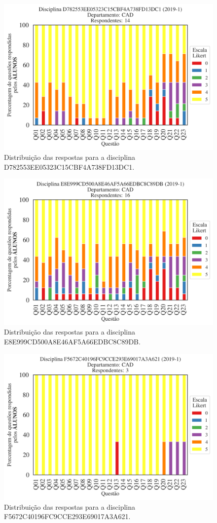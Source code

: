 \documentclass[a4paper,10pt]{article}
\begin{document}
\begin{figure}[h]
\centering
\includegraphics[width=0.485\linewidth]{analise_disciplina_departamento_CAD_ALUNO_TURMA_D782553EE05323C15CBF4A738FD13DC1.png}
\caption{\label{fig:analise_geral_departamento}                Distribuição das respostas para a disciplina D782553EE05323C15CBF4A738FD13DC1.}
\end{figure}
\begin{figure}[h]
\centering
\includegraphics[width=0.485\linewidth]{analise_disciplina_departamento_CAD_ALUNO_TURMA_E8E999CD500A8E46AF5A66EDBC8C89DB.png}
\caption{\label{fig:analise_geral_departamento}                Distribuição das respostas para a disciplina E8E999CD500A8E46AF5A66EDBC8C89DB.}
\end{figure}
\begin{figure}[h]
\centering
\includegraphics[width=0.485\linewidth]{analise_disciplina_departamento_CAD_ALUNO_TURMA_F5672C40196FC9CCE293E69017A3A621.png}
\caption{\label{fig:analise_geral_departamento}                Distribuição das respostas para a disciplina F5672C40196FC9CCE293E69017A3A621.}
\end{figure}
\end{document}
